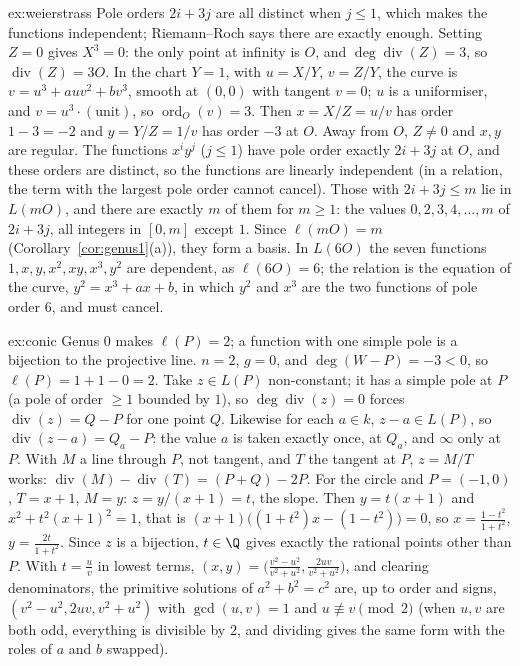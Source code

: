 \begin{solution}{ex:weierstrass}
\idea Pole orders $2i+3j$ are all distinct when $j\le1$, which makes the functions independent; Riemann--Roch says there are exactly enough.
\writeup Setting $Z=0$ gives $X^3=0$: the only point at infinity is $O$, and $\deg\operatorname{div}(Z)=3$, so $\operatorname{div}(Z)=3O$. In the chart $Y=1$, with
$u=X/Y$, $v=Z/Y$, the curve is $v=u^3+auv^2+bv^3$, smooth at $(0,0)$ with tangent $v=0$; $u$ is a uniformiser, and $v=u^3\cdot(\text{unit})$, so
$\operatorname{ord}_O(v)=3$. Then $x=X/Z=u/v$ has order $1-3=-2$ and $y=Y/Z=1/v$ has order $-3$ at $O$. Away from $O$, $Z\ne0$ and $x,y$ are regular. The
functions $x^iy^j$ ($j\le1$) have pole order exactly $2i+3j$ at $O$, and these orders are distinct, so the functions are linearly independent (in a
relation, the term with the largest pole order cannot cancel). Those with $2i+3j\le m$ lie in $L(mO)$, and there are exactly $m$ of them for
$m\ge1$: the values $0,2,3,4,\dots,m$ of $2i+3j$, all integers in $[0,m]$ except $1$. Since $\ell(mO)=m$ (Corollary~\ref{cor:genus1}(a)), they form a basis.
In $L(6O)$ the seven functions $1,x,y,x^2,xy,x^3,y^2$ are dependent, as $\ell(6O)=6$; the relation is the equation of the curve, $y^2=x^3+ax+b$, in which
$y^2$ and $x^3$ are the two functions of pole order $6$, and must cancel.
\end{solution}

\begin{solution}{ex:conic}
\idea Genus $0$ makes $\ell(P)=2$; a function with one simple pole is a bijection to the projective line.
\writeup $n=2$, $g=0$, and $\deg(W-P)=-3<0$, so $\ell(P)=1+1-0=2$. Take $z\in L(P)$ non-constant; it has a simple pole at $P$ (a pole of order $\ge1$
bounded by $1$), so $\deg\operatorname{div}(z)=0$ forces $\operatorname{div}(z)=Q-P$ for one point $Q$. Likewise for each $a\in k$, $z-a\in L(P)$, so
$\operatorname{div}(z-a)=Q_a-P$: the value $a$ is taken exactly once, at $Q_a$, and $\infty$ only at $P$. With $M$ a line through $P$, not tangent, and $T$
the tangent at $P$, $z=M/T$ works: $\operatorname{div}(M)-\operatorname{div}(T)=(P+Q)-2P$. For the circle and $P=(-1,0)$, $T=x+1$, $M=y$: $z=y/(x+1)=t$, the
slope. Then $y=t(x+1)$ and $x^2+t^2(x+1)^2=1$, that is $(x+1)\bigl((1+t^2)x-(1-t^2)\bigr)=0$, so $x=\frac{1-t^2}{1+t^2}$, $y=\frac{2t}{1+t^2}$. Since $z$ is a
bijection, $t\in\Q$ gives exactly the rational points other than $P$. With $t=\frac uv$ in lowest terms, $(x,y)=\bigl(\frac{v^2-u^2}{v^2+u^2},\frac{2uv}{v^2+u^2}\bigr)$,
and clearing denominators, the primitive solutions of $a^2+b^2=c^2$ are, up to order and signs, $(v^2-u^2,2uv,v^2+u^2)$ with $\gcd(u,v)=1$ and $u\not\equiv v\pmod2$
(when $u,v$ are both odd, everything is divisible by $2$, and dividing gives the same form with the roles of $a$ and $b$ swapped).
\end{solution}


